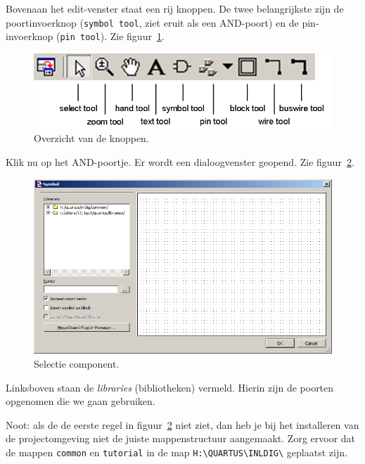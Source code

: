 \documentclass[a4paper,12pt,fleqn,twoside]{book}
\def\tutpicscale{0.455}
\newcommand{\naam}[1]{\texttt{#1}}
\begin{document}
Bovenaan het edit-venster staat een rij knoppen. De twee belangrijkste zijn
de poortinvoerknop (\naam{symbol tool}, ziet eruit als een AND-poort) en
de pin-invoerknop (\naam{pin tool}).
Zie figuur~\ref{fig:021schematictoolbarcooked}. 

\begin{figure}[H]
\centering
\includegraphics[scale=\tutpicscale]{021schematictoolbarcooked}
\caption{Overzicht van de knoppen.}
\label{fig:021schematictoolbarcooked}
\end{figure}

Klik nu op het AND-poortje. Er wordt een dialoogvenster geopend.
Zie figuur~\ref{fig:022symbolselection}.

\begin{figure}[H]
\centering
\includegraphics[scale=\tutpicscale]{022symbolselection}
\caption{Selectie component.}
\label{fig:022symbolselection}
\end{figure}

Linksboven staan de \textsl{libraries} (bibliotheken) vermeld. Hierin zijn de
poorten opgenomen die we gaan gebruiken.

Noot: als de de eerste regel in figuur~\ref{fig:022symbolselection} niet
ziet, dan heb je bij het installeren van de projectomgeving niet de
juiste mappenstructuur aangemaakt. Zorg ervoor dat de mappen \naam{common}
en \naam{tutorial} in de map \lstinline|H:\QUARTUS\INLDIG\| geplaatst zijn.
\end{document}
